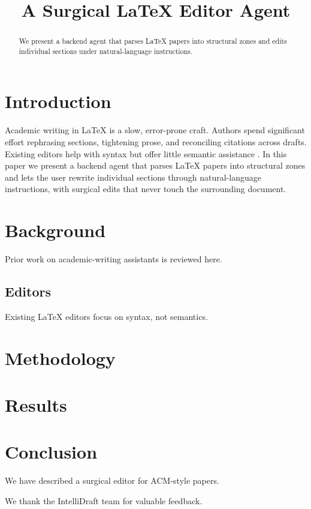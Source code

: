 \documentclass[sigconf]{acmart}
\title{A Surgical LaTeX Editor Agent}
\begin{document}
\begin{abstract}
We present a backend agent that parses LaTeX papers into structural zones
and edits individual sections under natural-language instructions.
\end{abstract}

\maketitle

\section{Introduction}
Academic writing in LaTeX is a slow, error-prone craft. Authors spend
significant effort rephrasing sections, tightening prose, and reconciling
citations across drafts. Existing editors help with syntax but offer little
semantic assistance \cite{Knuth1984Literate, Lamport1994LaTeX}.
In this paper we present a backend agent that parses LaTeX papers into
structural zones and lets the user rewrite individual sections through
natural-language instructions, with surgical edits that never touch the
surrounding document.

\section{Background}
\label{sec:background}
Prior work on academic-writing assistants is reviewed here.

\subsection{Editors}
Existing LaTeX editors focus on syntax, not semantics.

\section{Methodology}

\section{Results}

\section{Conclusion}
We have described a surgical editor for ACM-style papers.

\begin{acks}
We thank the IntelliDraft team for valuable feedback.
\end{acks}



\end{document}
